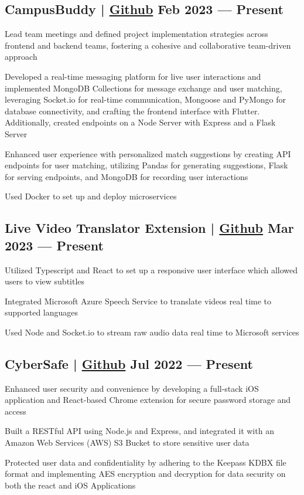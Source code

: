 \subsection{{CampusBuddy | \href{https://github.com/pegliang/CampusBuddy}{Github} \hfill Feb 2023 --- Present}}
\begin{zitemize}
\item Lead team meetings and defined project implementation strategies across frontend and backend teams, fostering a cohesive and collaborative team-driven approach
\item Developed a real-time messaging platform for live user interactions and implemented MongoDB Collections for message exchange and user matching, leveraging Socket.io for real-time communication, Mongoose and PyMongo for database connectivity, and crafting the frontend interface with Flutter. Additionally, created endpoints on a Node Server with Express and a Flask Server
\item Enhanced user experience with personalized match suggestions by creating API endpoints for user matching, utilizing Pandas for generating suggestions, Flask for serving endpoints, and MongoDB for recording user interactions
\item Used Docker to set up and deploy microservices
\end{zitemize}

\subsection{{Live Video Translator Extension | \href{https://github.com/jerikjakobsen/Translator-Extension}{Github} \hfill Mar 2023 --- Present}}
\begin{zitemize}
\item Utilized Typescript and React to set up a responsive user interface which allowed users to view subtitles
\item Integrated Microsoft Azure Speech Service to translate videos real time to supported languages
\item Used Node and Socket.io to stream raw audio data real time to Microsoft services
\end{zitemize}

\subsection{{CyberSafe | \href{https://github.com/jerikjakobsen/CyberSafe}{Github} \hfill Jul 2022 --- Present}}
\begin{zitemize}
\item Enhanced user security and convenience by developing a full-stack iOS application and React-based Chrome extension for secure password storage and access
\item Built a RESTful API using Node.js and Express, and integrated it with an Amazon Web Services (AWS) S3 Bucket to store sensitive user data
\item Protected user data and confidentiality by adhering to the Keepass KDBX file format and implementing AES encryption and decryption for data security on both the react and iOS Applications
\end{zitemize}